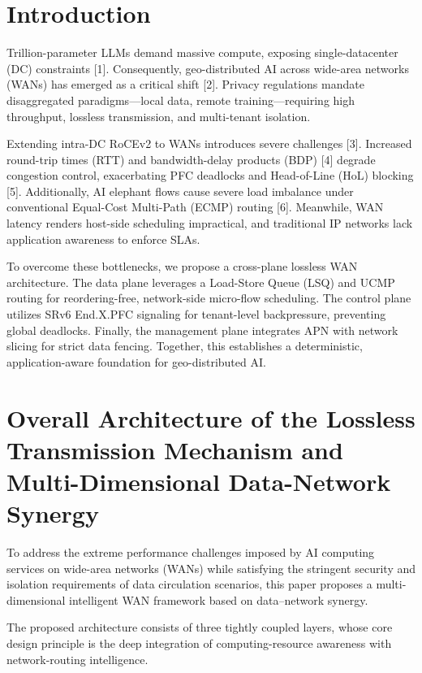 \documentclass[a4paper]{jpconf}
\begin{document}
\section{Introduction}


Trillion-parameter LLMs demand massive compute, exposing single-datacenter (DC) constraints [1]. Consequently, geo-distributed AI across wide-area networks (WANs) has emerged as a critical shift [2]. Privacy regulations mandate disaggregated paradigms---local data, remote training---requiring high throughput, lossless transmission, and multi-tenant isolation.


Extending intra-DC RoCEv2 to WANs introduces severe challenges [3]. Increased round-trip times (RTT) and bandwidth-delay products (BDP) [4] degrade congestion control, exacerbating PFC deadlocks and Head-of-Line (HoL) blocking [5]. Additionally, AI elephant flows cause severe load imbalance under conventional Equal-Cost Multi-Path (ECMP) routing [6]. Meanwhile, WAN latency renders host-side scheduling impractical, and traditional IP networks lack application awareness to enforce SLAs.


To overcome these bottlenecks, we propose a cross-plane lossless WAN architecture. The data plane leverages a Load-Store Queue (LSQ) and UCMP routing for reordering-free, network-side micro-flow scheduling. The control plane utilizes SRv6 End.X.PFC signaling for tenant-level backpressure, preventing global deadlocks. Finally, the management plane integrates APN with network slicing for strict data fencing. Together, this establishes a deterministic, application-aware foundation for geo-distributed AI.


\section{Overall Architecture of the Lossless Transmission Mechanism and Multi-Dimensional Data-Network Synergy}


To address the extreme performance challenges imposed by AI computing services on wide-area networks (WANs) while satisfying the stringent security and isolation requirements of data circulation scenarios, this paper proposes a multi-dimensional intelligent WAN framework based on data--network synergy.


The proposed architecture consists of three tightly coupled layers, whose core design principle is the deep integration of computing-resource awareness with network-routing intelligence.
\end{document}
